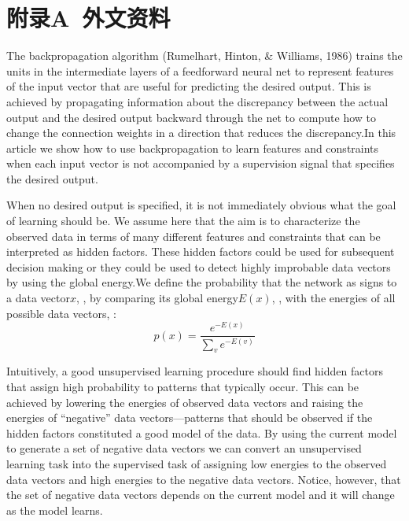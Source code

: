 

\section*{附录A~外文资料}

\par{The backpropagation algorithm (Rumelhart, Hinton, \& Williams, 1986) trains the units in the intermediate layers of a feedforward neural net to represent features of the input vector that are useful for predicting the desired output. This is achieved by propagating information about the discrepancy between the actual output and the desired output backward through the net to compute how to change the connection weights in a direction that reduces the discrepancy.In this article we show how to use backpropagation to learn features and constraints when each input vector is not accompanied by a supervision signal that specifies the desired output.}
\par{
When no desired output is specified, it is not immediately obvious what the goal of learning should be. We assume here that the aim is to characterize the observed data in terms of many different features and constraints that can be interpreted as hidden factors. These hidden factors could be used for subsequent decision making or they could be used to detect highly improbable data vectors by using the global energy.We define the probability that the network as signs to a data vector$x$,  , by comparing its global energy$E(x)$,  , with the energies of all possible data vectors,  :
\begin{equation}\label{equation1}p(x) = \frac{{{e^{ - E(x)}}}}{{\sum\nolimits_v {{e^{ - E(v)}}} }}\end{equation}
}
\par{
Intuitively, a good unsupervised learning procedure should find hidden factors that assign high probability to patterns that typically occur. This can be achieved by lowering the energies of observed data vectors and raising the energies of “negative” data vectors—patterns that should be observed if the hidden factors constituted a good model of the data. By using the current model to generate a set of negative data vectors we can convert an unsupervised learning task into the supervised task of assigning low energies to the observed data vectors and high energies to the negative data vectors. Notice, however, that the set of negative data vectors depends on the current model and it will change as the model learns. }
